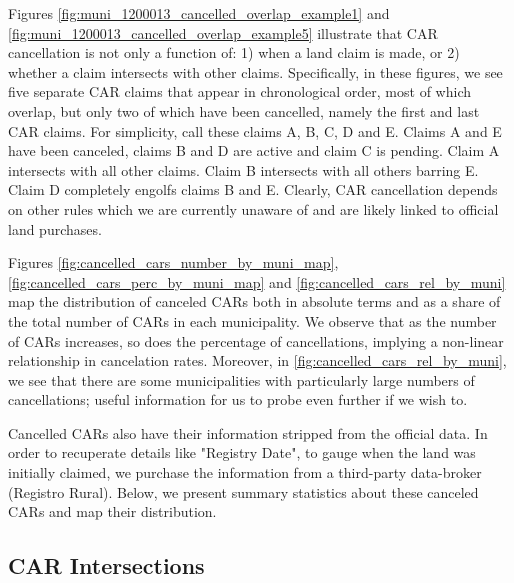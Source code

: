 \documentclass[12pt]{article}
\begin{document}
\begin{appendices}
    Figures \ref{fig:muni_1200013_cancelled_overlap_example1} and \ref{fig:muni_1200013_cancelled_overlap_example5} illustrate that CAR cancellation is not only a function of: 1) when a land claim is made, or 2) whether a claim intersects with other claims. Specifically, in these figures, we see five separate CAR claims that appear in chronological order, most of which overlap, but only two of which have been cancelled, namely the first and last CAR claims. For simplicity, call these claims A, B, C, D and E. Claims A and E have been canceled, claims B and D are active and claim C is pending. Claim A intersects with all other claims. Claim B intersects with all others barring E. Claim D completely engolfs claims B and E. Clearly, CAR cancellation depends on other rules which we are currently unaware of and are likely linked to official land purchases.
    
    Figures \ref{fig:cancelled_cars_number_by_muni_map}, \ref{fig:cancelled_cars_perc_by_muni_map} and \ref{fig:cancelled_cars_rel_by_muni} map the distribution of canceled CARs both in absolute terms and as a share of the total number of CARs in each municipality. We observe that as the number of CARs increases, so does the percentage of cancellations, implying a non-linear relationship in cancelation rates. Moreover, in \ref{fig:cancelled_cars_rel_by_muni}, we see that there are some municipalities with particularly large numbers of cancellations; useful information for us to probe even further if we wish to.
    
    Cancelled CARs also have their information stripped from the official data. In order to recuperate details like "Registry Date", to gauge when the land was initially claimed, we purchase the information from a third-party data-broker (Registro Rural). Below, we present summary statistics about these canceled CARs and map their distribution. 

    

     \subsection{CAR Intersections}


\end{appendices}
\end{document}
